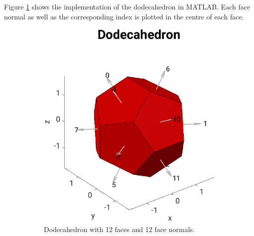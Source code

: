 \bigskip

Figure \ref{fig:Dodecahedron_MATLAB} shows the implementation of the dodecahedron in MATLAB. Each face normal as well as the corresponding index is plotted in the centre of each face.

\begin{figure}[H]
     \centering
     \begin{subfigure}[b]{0.47\textwidth}
         \centering
        \includegraphics[width=1.2\linewidth]{Graphics/Dodecahedron.eps}
         \caption{Dodecahedron with 12 faces and 12 face normals.}
         \label{fig:Dodecahedron_MATLAB}
     \end{subfigure}
     \hfill
     \begin{subfigure}[b]{0.47\textwidth}
         \centering

\end{subfigure}
\end{figure}
